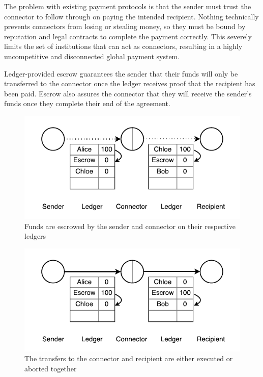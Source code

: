 \documentclass[letterpaper,twocolumn,10pt]{article}
\begin{document}
The problem with existing payment protocols is that the sender must trust the connector to follow through on paying the intended recipient. Nothing technically prevents connectors from losing or stealing money, so they must be bound by reputation and legal contracts to complete the payment correctly. This severely limits the set of institutions that can act as connectors, resulting in a highly uncompetitive and disconnected global payment system.

Ledger-provided escrow guarantees the sender that their funds will only be transferred to the connector once the ledger receives proof that the recipient has been paid. Escrow also assures the connector that they will receive the sender's funds once they complete their end of the agreement.

\begin{figure}[ht]
    \centering
    \includegraphics[width=\columnwidth]{figures/connector-escrow.pdf}
    \caption{Funds are escrowed by the sender and connector on their respective ledgers}
    \label{fig:connector-escrow}
\end{figure}

\begin{figure}[ht]
    \centering
    \includegraphics[width=\columnwidth]{figures/connector-execution.pdf}
    \caption{The transfers to the connector and recipient are either executed or aborted together}
    \label{fig:connector-execution}
\end{figure}
\end{document}
